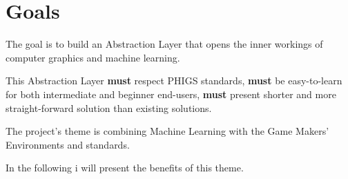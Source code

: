 
\chapter*{Goals}

  The goal is to build an Abstraction Layer that opens the inner workings of computer graphics and machine learning.

  This Abstraction Layer \textbf{must} respect PHIGS standards, \textbf{must} be easy-to-learn for both intermediate and beginner end-users, \textbf{must} present shorter and more straight-forward solution than existing solutions.

  The project's theme is combining Machine Learning with the Game Makers' Environments and standards.

  In the following i will present the benefits of this theme.

